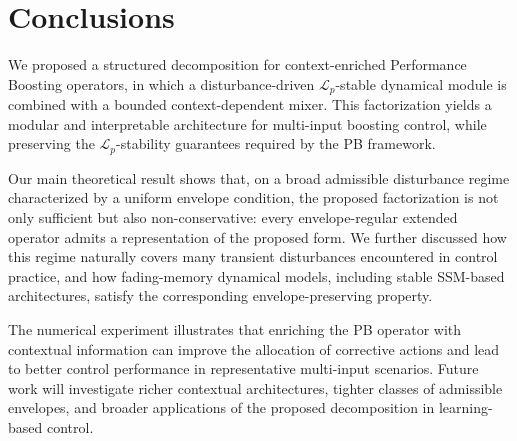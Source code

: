 \documentclass[journal,twoside,web]{ieeecolor}
\begin{document}
\section{Conclusions}

We proposed a structured decomposition for context-enriched Performance Boosting operators, in which a
disturbance-driven \(\mathcal L_p\)-stable dynamical module is combined with a bounded
context-dependent mixer. This factorization yields a modular and interpretable architecture for
multi-input boosting control, while preserving the \(\mathcal L_p\)-stability guarantees required by
the PB framework.

Our main theoretical result shows that, on a broad admissible disturbance regime characterized by a
uniform envelope condition, the proposed factorization is not only sufficient but also
non-conservative: every envelope-regular extended operator admits a representation of the proposed
form. We further discussed how this regime naturally covers many transient disturbances encountered in
control practice, and how fading-memory dynamical models, including stable SSM-based architectures,
satisfy the corresponding envelope-preserving property.

The numerical experiment illustrates that enriching the PB operator with contextual information can
improve the allocation of corrective actions and lead to better control performance in representative
multi-input scenarios. Future work will investigate richer contextual architectures, tighter classes of
admissible envelopes, and broader applications of the proposed decomposition in learning-based control.




\end{document}

